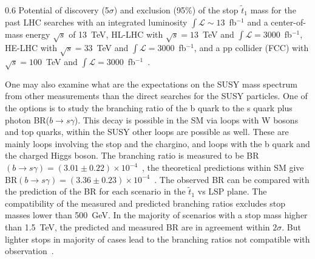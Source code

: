                  {0.6}       %
                 { Potential of discovery (5$\sigma$) and exclusion (95\%) of the stop $\tilde{t}_{1}$ mass for the past LHC searches with an integrated luminosity $\int \mathcal{L} \sim 13$~fb$^{-1}$ and a center-of-mass energy $\sqrt{s}$ of 13~TeV, HL-LHC with $\sqrt{s}= 13$~TeV and $\int \mathcal{L} = 3000$~fb$^{-1}$, HE-LHC with $\sqrt{s}= 33$~TeV and $\int \mathcal{L} = 3000$~fb$^{-1}$,  and a pp collider (FCC) with $\sqrt{s}= 100$~TeV and $\int \mathcal{L} = 3000$~fb$^{-1}$~\cite{Baer:2016bwh}.  }


One may also examine what are the expectations on the SUSY mass spectrum from other measurements than the direct searches for the SUSY particles. One of the options is to study the branching ratio of the b quark to the s quark plus photon BR($b \to s\gamma$).  This decay is possible in the SM via loops with W bosons and top quarks, within the SUSY other loops are possible as well. These are mainly loops involving the  stop and the chargino, and loops with the b quark and the charged Higgs boson. The branching ratio is measured to be BR$(b \to s\gamma) = (3.01 \pm 0.22) \times 10^{-4}$~\cite{Belle:2016ufb}, the theoretical predictions within SM give BR$(b \to s\gamma) = (3.36 \pm 0.23) \times 10^{-4}$~\cite{Misiak:2015xwa}. The observed BR can be compared with the prediction of the BR for each scenario in the $\tilde{t}_{1}$ vs LSP plane. The compatibility of the measured and predicted branching ratios excludes stop masses lower than 500~GeV. In the majority of scenarios with a stop mass higher than 1.5~TeV, the predicted and measured BR are in agreement within $2\sigma$. But lighter stops in majority of cases lead to the branching ratios not compatible with observation~\cite{Baer:2016bwh}.


